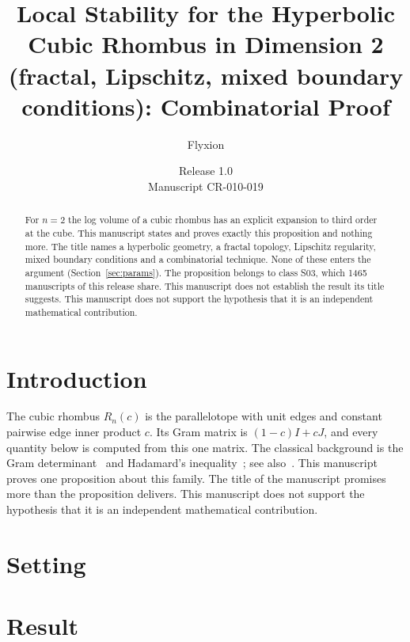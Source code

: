 \documentclass[11pt]{article}
\title{Local Stability for the Hyperbolic Cubic Rhombus in Dimension 2 (fractal, Lipschitz, mixed boundary conditions): Combinatorial Proof}
\author{Flyxion}
\date{Release 1.0\\ Manuscript CR-010-019}
\begin{document}
\maketitle
\begin{abstract}
For $n=2$ the log volume of a cubic rhombus has an explicit expansion to third order at the cube. This manuscript states and proves exactly this proposition and nothing more. The title names a hyperbolic geometry, a fractal topology, Lipschitz regularity, mixed boundary conditions and a combinatorial technique. None of these enters the argument (Section~\ref{sec:params}). The proposition belongs to class S03, which 1465 manuscripts of this release share. This manuscript does not establish the result its title suggests. This manuscript does not support the hypothesis that it is an independent mathematical contribution.
\end{abstract}

\section{Introduction}
The cubic rhombus $R_n(c)$ is the parallelotope with unit edges and constant pairwise edge inner product $c$. Its Gram matrix is $(1-c)I+cJ$, and every quantity below is computed from this one matrix. The classical background is the Gram determinant~\cite{gram} and Hadamard's inequality~\cite{hadamard}; see also~\cite{hj}.
This manuscript proves one proposition about this family. The title of the manuscript promises more than the proposition delivers. This manuscript does not support the hypothesis that it is an independent mathematical contribution.

\section{Setting}


\section{Result}

\end{document}

